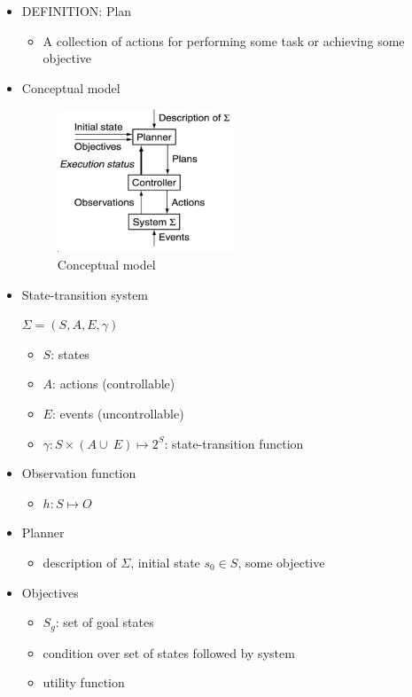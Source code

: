\begin{itemize}
 \item DEFINITION: Plan
 \begin{itemize}
   \item A collection of actions for performing some task
   or achieving some objective
  \end{itemize} 	
  
 \item Conceptual model
  \begin{figure}[h]
    \centering
    \includegraphics{./img/conceptual_model.png}
    \caption{Conceptual model}
  \end{figure}
 
 \item State-transition system
 
	$\Sigma = (S,A,E,\gamma)$
  \begin{itemize}
   \item $S$: states
   \item $A$: actions (controllable)
   \item $E$: events (uncontrollable)
   \item $\gamma : S \times ( A \cup\ E ) \mapsto 2^{S}$: state-transition function
  \end{itemize} 	
  
  \item Observation function
    \begin{itemize}
    \item $h:S \mapsto O$
    \end{itemize} 	
  \item Planner
    \begin{itemize}
    \item description of $\Sigma$, initial state $s_0 \in S$, some objective
    \end{itemize} 	
    
 \item Objectives
 \begin{itemize}
  \item $S_g$: set of goal states
  \item condition over set of states followed by system
  \item utility function
 \end{itemize}
 

\end{itemize}

